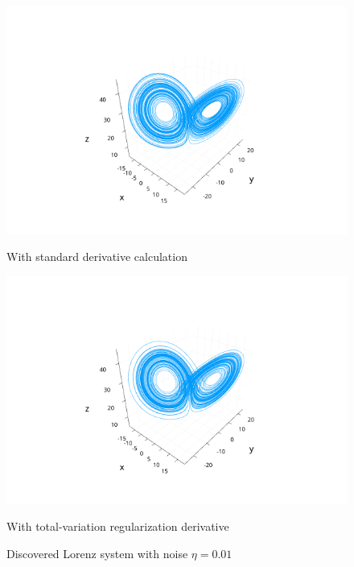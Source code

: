 \documentclass[10pt]{paper}
\begin{document}
\begin{figure}[h]
	\caption{Discovered Lorenz system with noise $\eta = 0.01$}
	\label{fig:lorenz_system_found_001}

	\centering 
	\begin{minipage}{0.47\textwidth}
		\begin{center}
			\includegraphics[width = \textwidth, trim={4.3cm, 1.9cm, 4.3cm, 3.5cm}, clip]{lorenz_found_001_normal.png}

			With standard derivative calculation
		\end{center}
	\end{minipage}%
	\begin{minipage}{0.47\textwidth}
		\begin{center}
			\includegraphics[width = \textwidth, trim={4.3cm, 1.9cm, 4.3cm, 3.5cm}, clip]{lorenz_found_001_tvdiff.png}

			With total-variation regularization derivative
		\end{center}
	\end{minipage}
\end{figure}	
\end{document}
